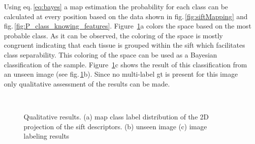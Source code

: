 \documentclass[a4paper, 10pt, conference]{llncs}      %
\begin{document}
Using eq.\,\ref{eq:bayes} a \ac{map} estimation the probability for each class can be calculated at every position based on the data shown in fig.\,\ref{fig:siftMapping} and fig.\,\ref{fig:P_class_knowing_features}. Figure~\ref{fig:mapQualitativeResults}a colors the space based on the most probable class. As it can be observed, the coloring of the space is mostly congruent indicating that each tissue is grouped within the \ac{sift} which facilitates class separability. This coloring of the space can be used as a Bayesian classification of the sample. Figure~\ref{fig:mapQualitativeResults}c   shows the result of this classification from an unseen image (see fig.\,\ref{fig:mapQualitativeResults}b). Since no multi-label \ac{gt} is present for this image only qualitative assessment of the results can be made. 

\begin{figure}[Htbp]
\centering
{}\,
\,
\caption{ Qualitative results. (a) \ac{map} class label distribution of the 2D projection of the \ac{sift} descriptors. (b) unseen image (c) image labeling results}
\label{fig:mapQualitativeResults}
\end{figure}
\end{document}
